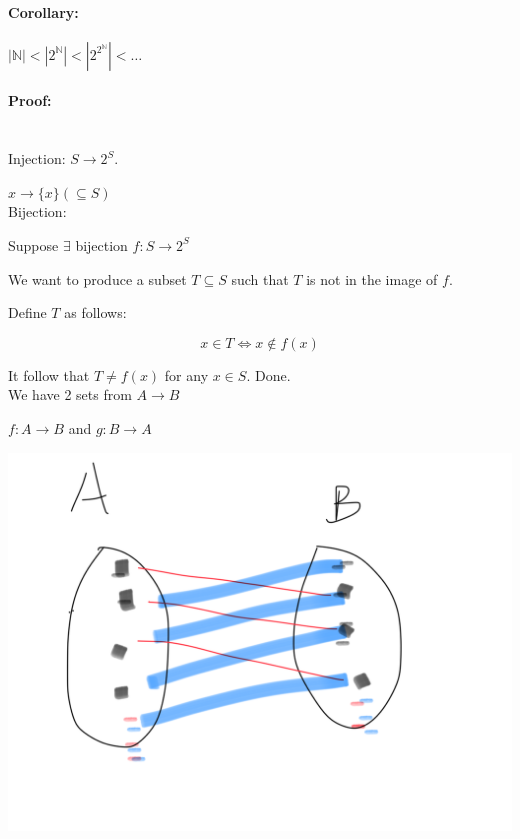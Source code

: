 \documentclass[a4paper, 11pt, twoside]{article}
\begin{document}
\paragraph{Corollary:} $|\mathbb{N}|<|2^{\mathbb{N}}|<|2^{2^{\mathbb{N}}}|<\dots$

\paragraph{Proof:}\ \\

Injection: $S\to 2^{S}$.

$x\to \{x\} (\subseteq S)$\\

Bijection:

Suppose $\exists$ bijection $f:S\to 2^{S}$

We want to produce a subset $T\subseteq S$ such that $T$ is not in the image of $f$.

Define $T$ as follows:

\[x \in T \iff x\not\in f(x)\]

It follow that $ T\not = f(x)$ for any $x\in S$. Done.\\

We have 2 sets from $A\to B$ 

$f:A\to B$ and $g: B\to A$

\includegraphics[width=\textwidth]{images/AB}
\end{document}
